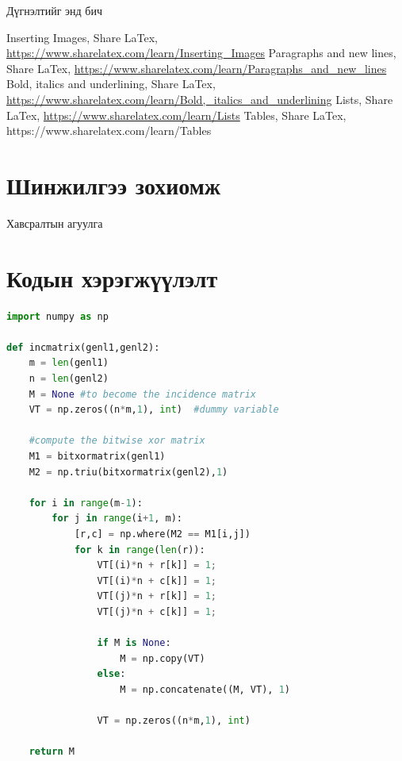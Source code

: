 \documentclass[12pt,A4]{report}
\begin{document}
Дүгнэлтийг энд бич


\singlespace
{}
\begin{thebibliography}{}
	Inserting Images, Share LaTex, \url{https://www.sharelatex.com/learn/Inserting_Images}
	Paragraphs and new lines,  Share LaTex, \url{https://www.sharelatex.com/learn/Paragraphs_and_new_lines}
	Bold, italics and underlining, Share LaTex, \url{https://www.sharelatex.com/learn/Bold,_italics_and_underlining}
	Lists, Share LaTex, \url{https://www.sharelatex.com/learn/Lists}
    Tables, Share LaTex, https://www.sharelatex.com/learn/Tables
\end{thebibliography}


\appendix
{}

\chapter{Шинжилгээ зохиомж}
Хавсралтын агуулга

\chapter{Кодын хэрэгжүүлэлт}


\begin{lstlisting}[language=Python]
import numpy as np
 
def incmatrix(genl1,genl2):
    m = len(genl1)
    n = len(genl2)
    M = None #to become the incidence matrix
    VT = np.zeros((n*m,1), int)  #dummy variable
 
    #compute the bitwise xor matrix
    M1 = bitxormatrix(genl1)
    M2 = np.triu(bitxormatrix(genl2),1) 
 
    for i in range(m-1):
        for j in range(i+1, m):
            [r,c] = np.where(M2 == M1[i,j])
            for k in range(len(r)):
                VT[(i)*n + r[k]] = 1;
                VT[(i)*n + c[k]] = 1;
                VT[(j)*n + r[k]] = 1;
                VT[(j)*n + c[k]] = 1;
 
                if M is None:
                    M = np.copy(VT)
                else:
                    M = np.concatenate((M, VT), 1)
 
                VT = np.zeros((n*m,1), int)
 
    return M
\end{lstlisting}
\end{document}
